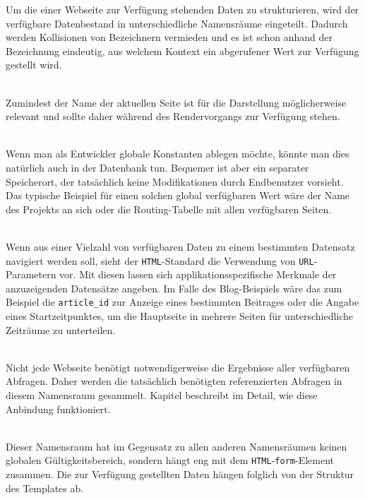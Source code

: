 Um die einer Webseite zur Verfügung stehenden Daten zu strukturieren, wird der verfügbare Datenbestand in unterschiedliche Namensräume eingeteilt. Dadurch werden Kollisionen von Bezeichnern vermieden und es ist schon anhand der Bezeichnung eindeutig, aus welchem Kontext ein abgerufener Wert zur Verfügung gestellt wird.

\begin{description}[noitemsep]
\item[\texttt{page} für Eigenschaften der Seite] \hfill \\
  Zumindest der Name der aktuellen Seite ist für die Darstellung möglicherweise relevant und sollte daher während des Rendervorgangs zur Verfügung stehen.
\item[\texttt{project} für Eigenschaften des Projektes] \hfill \\
  Wenn man als Entwickler globale Konstanten ablegen möchte, könnte man dies natürlich auch in der Datenbank tun. Bequemer ist aber ein separater Speicherort, der tatsächlich keine Modifikationen durch Endbenutzer vorsieht. Das typische Beispiel für einen solchen global verfügbaren Wert wäre der Name des Projekts an sich oder die Routing-Tabelle mit allen verfügbaren Seiten.
\item[\texttt{get} für \texttt{URL}-Parameter] \hfill \\
  Wenn aus einer Vielzahl von verfügbaren Daten zu einem bestimmten Datensatz navigiert werden soll, sieht der \texttt{HTML}-Standard die Verwendung von \texttt{URL}-Parametern vor. Mit diesen lassen sich applikationsspezifische Merkmale der anzuzeigenden Datensätze angeben. Im Falle des Blog-Beispiels wäre das zum Beispiel die \texttt{article\_id} zur Anzeige eines bestimmten Beitrages oder die Angabe eines Startzeitpunktes, um die Hauptseite in mehrere Seiten für unterschiedliche Zeiträume zu unterteilen.
\item[\texttt{query} für \texttt{SELECT}-Abfragen] \hfill \\
  Nicht jede Webseite benötigt notwendigerweise die Ergebnisse aller verfügbaren Abfragen. Daher werden die tatsächlich benötigten referenzierten Abfragen in diesem Namensraum gesammelt. Kapitel  beschreibt im Detail, wie diese Anbindung funktioniert.
\item[\texttt{form} für Benutzereingaben] \hfill \\
  Dieser Namensraum hat im Gegensatz zu allen anderen Namensräumen keinen globalen Gültigkeitsbereich, sondern hängt eng mit dem \texttt{HTML}-\texttt{form}-Element zusammen. Die zur Verfügung gestellten Daten hängen folglich von der Struktur des Templates ab.
\end{description}

